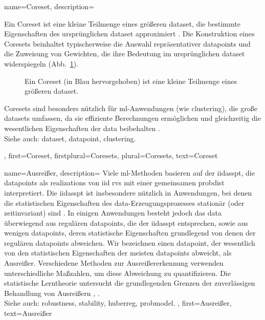 {{{{
{name={Coreset}, 
	description={Ein Coreset ist eine kleine Teilmenge eines größeren \gls{dataset}, 
	die bestimmte Eigenschaften des ursprünglichen \gls{dataset} approximiert \cite{Chai2023}. 
	Die Konstruktion eines Coresets beinhaltet typischerweise die Auswahl repräsentativer \glspl{datapoint} 
	und die Zuweisung von Gewichten, die ihre Bedeutung im ursprünglichen \gls{dataset} widerspiegeln (Abb.~\ref{fig_coreset_dict}).
        \begin{figure}[H]
			\centering
\caption{Ein Coreset (in Blau hervorgehoben) ist eine kleine Teilmenge eines größeren \gls{dataset}. \label{fig_coreset_dict}}
\end{figure}
	Coresets sind besonders nützlich für \gls{ml}-Anwendungen (wie \gls{clustering}), 
	die große \glspl{dataset} umfassen, da sie effiziente Berechnungen ermöglichen 
	und gleichzeitig die wesentlichen Eigenschaften der \gls{data} beibehalten \cite{DistkmeansBalcan2013}.
				\\
	Siehe auch: \gls{dataset}, \gls{datapoint}, \gls{clustering}.},
	first={Coreset},
	firstplural={Coresets},
	plural={Coresets},
	text={Coreset} 
}

{
    name={Ausreißer}, 
    description={
        Viele  \gls{ml}-Methoden basieren auf der \gls{iidasspt}, die \glspl{datapoint} 
        als \glspl{realization} von \gls{iid} \glspl{rv} mit einer gemeinsamen \gls{probdist} interpretiert. 
        Die \gls{iidasspt} ist insbesondere nützlich in Anwendungen, bei denen die statistischen Eigenschaften 
        des \gls{data}-Erzeugungsprozesses stationär (oder zeitinvariant) sind \cite{Brockwell91}. 
        In einigen Anwendungen besteht jedoch das \gls{data} überwiegend aus regulären \glspl{datapoint}, 
        die der \gls{iidasspt} entsprechen, sowie aus wenigen \glspl{datapoint}, deren statistische 
        Eigenschaften grundlegend von denen der regulären \glspl{datapoint} abweichen. 
        Wir bezeichnen einen \gls{datapoint}, der wesentlich von den statistischen Eigenschaften 
        der meisten \glspl{datapoint} abweicht, als Ausreißer. Verschiedene Methoden zur 
        Ausreißererkennung verwenden unterschiedliche Maßzahlen, um diese Abweichung zu quantifizieren. 
        Die statistische Lerntheorie untersucht die grundlegenden Grenzen der zuverlässigen 
        Behandlung von Ausreißern \cite{doi:10.1137/0222052}, \cite{10.1214/20-AOS1961}. 
        \\
        Siehe auch: \gls{robustness}, \gls{stability}, \gls{huberreg}, \gls{probmodel}.
    },
    first={Ausreißer},
    text={Ausreißer} 
}


}}}}
